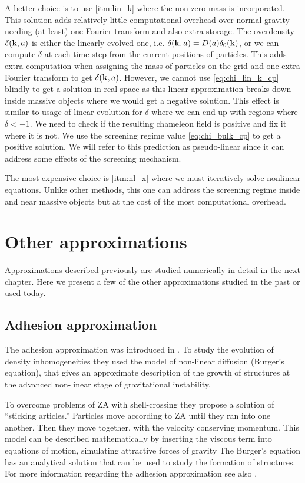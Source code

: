 A better choice is to use \ref{itm:lin_k} where the non-zero mass is incorporated. This solution adds relatively little computational overhead over normal gravity -- needing (at least) one Fourier transform and also extra storage. The overdensity $\delta(\mathbf k, a)$ is either the linearly evolved one, i.e. $\delta(\mathbf k, a) = D(a)\delta_0(\mathbf k)$, or we can compute $\delta$ at each time-step from the current positions of particles. This adds extra computation when assigning the mass of particles on the grid and one extra Fourier transform to get $\delta(\mathbf k, a)$. 
However, we cannot use \eqref{eq:chi_lin_k_cp} blindly to get a solution in real space as this linear approximation breaks down inside massive objects where we would get a negative solution. This effect is similar to usage of linear evolution for $\delta$ where we can end up with regions where $\delta<-1$. We need to check if the resulting chameleon field is positive and fix it where it is not. We use the screening regime value \eqref{eq:chi_bulk_cp} to get a positive solution. We will refer to this prediction as pseudo-linear since it can address some effects of the screening mechanism.

The most expensive choice is \ref{itm:nl_x} where we must iteratively solve nonlinear equations. Unlike other methods, this one can address the screening regime inside and near massive objects but at the cost of the most computational overhead.

\section{Other approximations}
Approximations described previously are studied numerically in detail in the next chapter. Here we present a few of the other approximations studied in the past or used today.

\subsection{Adhesion approximation}
The adhesion approximation was introduced in \textcite{1989MNRAS.236..385G}. To study the evolution of density inhomogeneities they used the model of non-linear diffusion (Burger's equation), that gives an approximate description of the growth of structures at the advanced non-linear stage of gravitational instability.

To overcome problems of ZA with shell-crossing they propose a solution of ``sticking articles.'' Particles move according to ZA until they ran into one another. Then they move together, with the velocity conserving momentum. This model can be described mathematically by inserting the viscous term into equations of motion, simulating attractive forces of gravity
The Burger's equation has an analytical solution that can be used to study the formation of structures. For more information regarding the adhesion approximation see  also \textcite{1990MNRAS.247..260W,1994ApJ...428...28M}.

